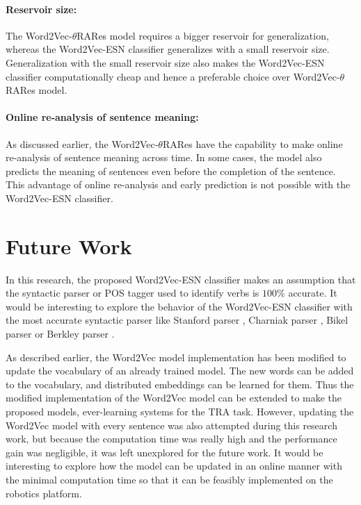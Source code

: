 \paragraph{Reservoir size:} The Word2Vec-$\theta$RARes model requires a bigger reservoir for generalization, whereas the Word2Vec-ESN classifier generalizes with a small reservoir size. Generalization with the small reservoir size also makes the Word2Vec-ESN classifier computationally cheap and hence a preferable choice over Word2Vec-$\theta$RARes model.

\paragraph{Online re-analysis of sentence meaning:} As discussed earlier, the Word2Vec-$\theta$RARes have the capability to make online re-analysis of sentence meaning across time. In some cases, the model also predicts the meaning of sentences even before the completion of the sentence. This advantage of online re-analysis and early prediction is not possible with the Word2Vec-ESN classifier.

\section{Future Work}

In this research, the proposed Word2Vec-ESN classifier makes an assumption that the syntactic parser or POS tagger used to identify verbs is $100 \%$ accurate. It would be interesting to explore the behavior of the Word2Vec-ESN classifier with the most accurate syntactic parser like Stanford parser \cite{parser:stanford}, Charniak parser \cite{charniak_parser:2000}, Bikel parser \cite{parser:bikel:2004} or Berkley parser \cite{parser:berkley:2006}.

As described earlier, the Word2Vec model implementation has been modified to update the vocabulary of an already trained model. The new words can be added to the vocabulary, and distributed embeddings can be learned for them. Thus the modified implementation of the Word2Vec model can be extended to make the proposed models, ever-learning systems for the TRA task. However, updating the Word2Vec model with every sentence was also attempted during this research work, but because the computation time was really high and the performance gain was negligible, it was left unexplored for the future work. It would be interesting to explore how the model can be updated in an online manner with the minimal computation time so that it can be feasibly implemented on the robotics platform. 

